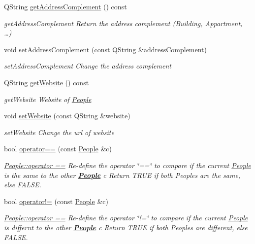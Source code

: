 \begin{DoxyCompactItemize}
Q\-String \hyperlink{classModels_1_1People_ac57d89dcc2a06aabdfb37694183d68f0}{get\-Address\-Complement} () const 
\begin{DoxyCompactList}\small\item\em get\-Address\-Complement Return the address complement (Building, Appartment, …) \end{DoxyCompactList}\item 
void \hyperlink{classModels_1_1People_ad8dd15780dad1af2ab2a436bab8c4b58}{set\-Address\-Complement} (const Q\-String \&address\-Complement)
\begin{DoxyCompactList}\small\item\em set\-Address\-Complement Change the address complement \end{DoxyCompactList}\item 
Q\-String \hyperlink{classModels_1_1People_a898d32c40d89376bd7e8373e2f07a056}{get\-Website} () const 
\begin{DoxyCompactList}\small\item\em get\-Website Website of \hyperlink{classModels_1_1People}{People} \end{DoxyCompactList}\item 
void \hyperlink{classModels_1_1People_acd66787d72c4b69a04d0ce228260b784}{set\-Website} (const Q\-String \&website)
\begin{DoxyCompactList}\small\item\em set\-Website Change the url of website \end{DoxyCompactList}\item 
bool \hyperlink{classModels_1_1People_a1c875989cffc3119ff1f263c7898bbdb}{operator==} (const \hyperlink{classModels_1_1People}{People} \&c)
\begin{DoxyCompactList}\small\item\em \hyperlink{classModels_1_1People_a1c875989cffc3119ff1f263c7898bbdb}{People\-::operator ==} Re-\/define the operator \char`\"{}==\char`\"{} to compare if the current \hyperlink{classModels_1_1People}{People} is the same to the other {\bfseries \hyperlink{classModels_1_1People}{People}} {\itshape c} Return T\-R\-U\-E if both Peoples are the same, else F\-A\-L\-S\-E. \end{DoxyCompactList}\item 
bool \hyperlink{classModels_1_1People_afcc4f66db1e1b1deefb849fffe82d616}{operator!=} (const \hyperlink{classModels_1_1People}{People} \&c)
\begin{DoxyCompactList}\small\item\em \hyperlink{classModels_1_1People_a1c875989cffc3119ff1f263c7898bbdb}{People\-::operator ==} Re-\/define the operator \char`\"{}!=\char`\"{} to compare if the current \hyperlink{classModels_1_1People}{People} is differnt to the other {\bfseries \hyperlink{classModels_1_1People}{People}} {\itshape c} Return T\-R\-U\-E if both Peoples are different, else F\-A\-L\-S\-E. \end{DoxyCompactList}\end{DoxyCompactItemize}


